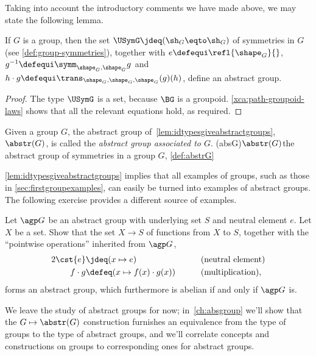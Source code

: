 Taking into account the introductory comments we have made above, we may state the following lemma.

\begin{lemma}\label{lem:idtypesgiveabstractgroups}
  If $G$ is a group, then the set $\USymG \jdeq (\sh_G\eqto\sh_G)$
  of symmetries in $G$ (see \cref{def:group-symmetries}),
  together with $e\defequi\refl{\shape_G}{}$,
  $g^{-1}\defequi\symm_{\shape_G,\shape_G}g$
  and $h \cdot g \defequi \trans_{\shape_G,\shape_G,\shape_G}(g)(h)$, define an abstract group.
\end{lemma}

\begin{proof}
  The type $\USymG$ is a set, because $\BG$ is a groupoid.
  \cref{xca:path-groupoid-laws} shows that all the relevant equations hold, as required.
\end{proof}

\begin{definition}\label{def:abstrG}
  Given a group $G$, the abstract group of~\cref{lem:idtypesgiveabstractgroups},
  $\abstr(G)$, is called the \emph{abstract group associated to $G$}.%
  \glossary(absG){$\protect\abstr(G)$}{the abstract group of symmetries in a group $G$,
  \cref{def:abstrG}}
\end{definition}

\cref{lem:idtypesgiveabstractgroups} implies that all examples of
groups, such as those in \cref{sec:firstgroupexamples}, can easily
be turned into examples of abstract groups. The following exercise
provides a different source of examples.

\begin{xca}\label{xca:abstract-group-of-maps}
  Let $\agp G$ be an abstract group with underlying set $S$
  and neutral element $e$.
  Let $X$ be a set. Show that the set $X\to S$ of functions
  from $X$ to $S$, together with the ``pointwise operations''
  inherited from $\agp G$,
  \begin{alignat*}2
    \cst{e} &\jdeq (x \mapsto e) &\qquad &\text{(neutral element)}\\
    f \cdot g &\defeq (x \mapsto f(x) \cdot g(x)) &\qquad &\text{(multiplication)},
  \end{alignat*}
  forms an abstract group, which furthermore is abelian if and only
  if $\agp G$ is.
\end{xca}

We leave the study of abstract groups for now;
in~\cref{ch:absgroup} we'll
show that the $G \mapsto \abstr(G)$ construction
furnishes an equivalence from the type of groups to the type of abstract groups,
and we'll correlate concepts and constructions on groups
to corresponding ones for abstract groups.

